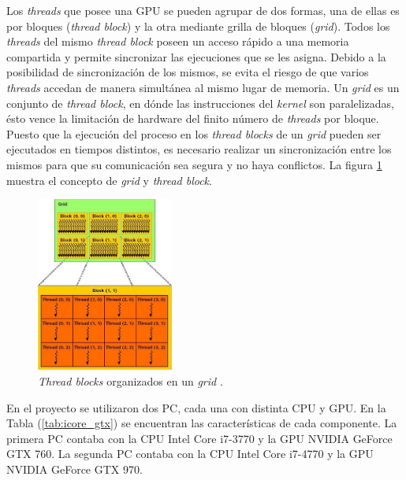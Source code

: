 Los \textit{threads} que posee una GPU se pueden agrupar de dos formas, una de ellas es por bloques (\textit{thread block}) y la otra mediante grilla de bloques (\textit{grid}). Todos los \textit{threads} del mismo \textit{thread block} poseen un acceso rápido a una memoria compartida y permite sincronizar las ejecuciones que se les asigna. Debido a la posibilidad de sincronización de los mismos, se evita el riesgo de que varios \textit{threads} accedan de manera simultánea al mismo lugar de memoria. Un \textit{grid} es un conjunto de \textit{thread block}, en dónde las instrucciones del \textit{kernel} son paralelizadas, ésto vence la limitación de hardware del finito número de \textit{threads} por bloque. Puesto que la ejecución del proceso en los \textit{thread blocks} de un \textit{grid} pueden ser ejecutados en tiempos distintos, es necesario realizar un sincronización entre los mismos para que su comunicación sea segura y no haya conflictos\cite{tolke2010implementation}. La figura \ref{fig:block_grid_threads} muestra el concepto de \textit{grid} y \textit{thread block}.

\newpage
\begin{figure}[h!]
	\centering
	\includegraphics[width=0.4\textwidth]{figs/cap3/threads_block_grid.jpg}
	\caption{\textit{Thread blocks} organizados en un \textit{grid} \cite{rinaldi2011modelos}.}
	\label{fig:block_grid_threads}
\end{figure}

En el proyecto se utilizaron dos PC, cada una con distinta CPU y GPU. En la Tabla (\ref{tab:icore_gtx}) se encuentran las características de cada componente. La primera PC contaba con la CPU Intel Core i7-3770 y la GPU NVIDIA GeForce GTX 760. La segunda PC contaba con la CPU Intel Core i7-4770 y la GPU NVIDIA GeForce GTX 970.

